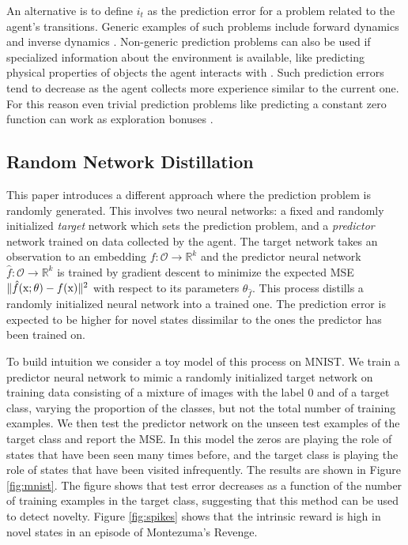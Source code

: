 \documentclass{article} \usepackage[dvipsnames]{xcolor}
\begin{document}
An alternative is to define $i_t$ as the prediction error for a problem related to the agent's transitions. Generic examples of such problems include forward dynamics \citep{schmidhuber_curiosity,stadie2015incentivizing,josh_surprise,pathakICMl17curiosity,burda18largescale} and inverse dynamics \citep{haber2018learning}. Non-generic prediction problems can also be used if specialized information about the environment is available, like predicting physical properties of objects the agent interacts with \citep{denil2016learning}. Such prediction errors tend to decrease as the agent collects more experience similar to the current one. For this reason even trivial prediction problems like predicting a constant zero function can work as exploration bonuses \citep{fox2018dora}.

\subsection{Random Network Distillation}

\label{sec:rnd}



This paper introduces a different approach where the prediction problem is randomly generated. This involves two neural networks: a fixed and randomly initialized \emph{target} network which sets the prediction problem, and a \emph{predictor} network trained on data collected by the agent. The target network takes an observation to an embedding $f: \mathcal{O} \to \mathbb{R}^k$ and the predictor neural network $\hat{f}: \mathcal{O} \to \mathbb{R}^k$ is trained by gradient descent to minimize the expected MSE $\Vert \hat{f}({\textnormal{x}}; \theta) - f({\textnormal{x}}) \Vert^2$ with respect to its parameters $\theta_{\hat{f}}$. This process distills a randomly initialized neural network into a trained one. The prediction error is expected to be higher for novel states dissimilar to the ones the predictor has been trained on.

To build intuition we consider a toy model of this process on MNIST. We train a predictor neural network to mimic a randomly initialized target network on training data consisting of a mixture of images with the label 0 and of a target class, varying the proportion of the classes, but not the total number of training examples. We then test the predictor network on the unseen test examples of the target class and report the MSE. In this model the zeros are playing the role of states that have been seen many times before, and the target class is playing the role of states that have been visited infrequently. The results are shown in Figure \ref{fig:mnist}. The figure shows that test error decreases as a function of the number of training examples in the target class, suggesting that this method can be used to detect novelty. Figure \ref{fig:spikes} shows that the intrinsic reward is high in novel states in an episode of Montezuma's Revenge.
\end{document}
